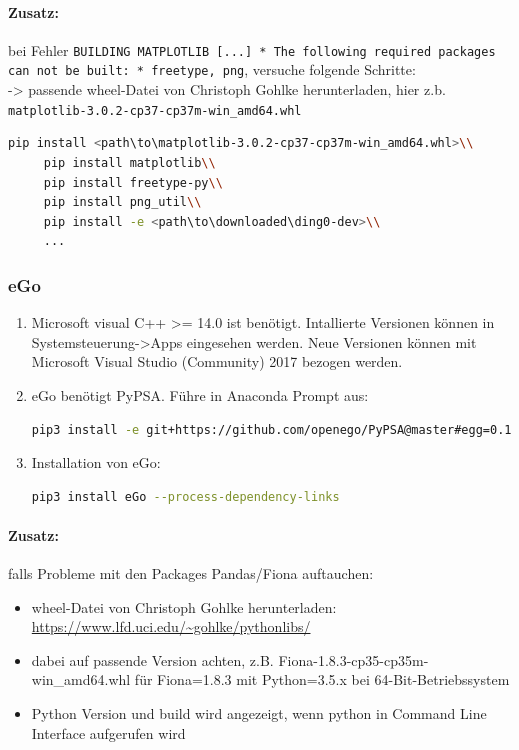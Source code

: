 \documentclass[
a4paper,     %
12pt         %
]{scrartcl}  %
\begin{document}
\paragraph{Zusatz: } bei Fehler \texttt{BUILDING MATPLOTLIB [...] * The following required packages can not be built: * freetype, png}, versuche folgende Schritte:\\
-> passende wheel-Datei von Christoph Gohlke herunterladen, hier z.b. \texttt{matplotlib-3.0.2-cp37-cp37m-win\_amd64.whl}\\
\begin{lstlisting}[language=bash]
	 pip install <path\to\matplotlib-3.0.2-cp37-cp37m-win_amd64.whl>\\
	 pip install matplotlib\\
	 pip install freetype-py\\
	 pip install png_util\\
	 pip install -e <path\to\downloaded\ding0-dev>\\
	 ...
\end{lstlisting}

\subsubsection{eGo}
\begin{enumerate}
	\item Microsoft visual C++ >= 14.0 ist benötigt. Intallierte Versionen können in Systemsteuerung->Apps eingesehen werden. Neue Versionen können mit Microsoft Visual Studio (Community) 2017 bezogen werden.
	\item eGo benötigt PyPSA. Führe in Anaconda Prompt aus:
	\begin{lstlisting}[language=bash]
		pip3 install -e git+https://github.com/openego/PyPSA@master#egg=0.11.0fork
	\end{lstlisting}
	\item Installation von eGo:
	\begin{lstlisting}[language=bash]
		pip3 install eGo --process-dependency-links
	\end{lstlisting}
\end{enumerate}

\paragraph{Zusatz: }falls Probleme mit den Packages Pandas/Fiona auftauchen:
\begin{itemize}
\item wheel-Datei von Christoph Gohlke herunterladen: \url{https://www.lfd.uci.edu/~gohlke/pythonlibs/}
\item dabei auf passende Version achten, z.B. Fiona-1.8.3-cp35-cp35m-win\_amd64.whl für Fiona=1.8.3 mit Python=3.5.x bei 64-Bit-Betriebssystem
\item Python Version und build wird angezeigt, wenn python in Command Line Interface aufgerufen wird

\end{itemize}
\end{document}
